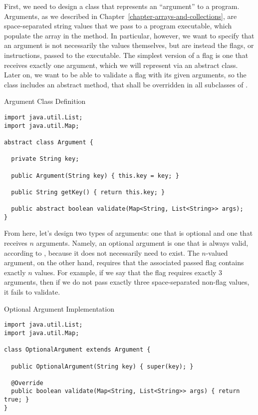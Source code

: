 First, we need to design a class that represents an ``argument'' to a program. Arguments, as we described in Chapter~\ref{chapter-arrays-and-collections}, are space-separated string values that we pass to a program executable, which populate the  array in the  method. In particular, however, we want to specify that an argument is not necessarily the values themselves, but are instead the flags, or instructions, passed to the executable. The simplest version of a flag is one that receives exactly one argument, which we will represent via an abstract  class. Later on, we want to be able to validate a flag with its given arguments, so the  class includes an abstract  method, that shall be overridden in all subclasses of .

\begin{cl}[]{Argument Class Definition}
\begin{lstlisting}[language=MyJava]
import java.util.List;
import java.util.Map;

abstract class Argument {

  private String key;

  public Argument(String key) { this.key = key; }

  public String getKey() { return this.key; }

  public abstract boolean validate(Map<String, List<String>> args);
}
\end{lstlisting}
\end{cl}

From here, let's design two types of arguments: one that is optional and one that receives $n$ arguments. Namely, an optional argument is one that is always valid, according to , because it does not necessarily need to exist. The $n$-valued argument, on the other hand, requires that the associated passed flag contains exactly $n$ values. For example, if we say that the  flag requires exactly $3$ arguments, then if we do not pass exactly three space-separated non-flag values, it fails to validate.

\begin{cl}[]{Optional Argument Implementation}
\begin{lstlisting}[language=MyJava]
import java.util.List;
import java.util.Map;

class OptionalArgument extends Argument {

  public OptionalArgument(String key) { super(key); }

  @Override
  public boolean validate(Map<String, List<String>> args) { return true; }
}
\end{lstlisting}
\end{cl}

